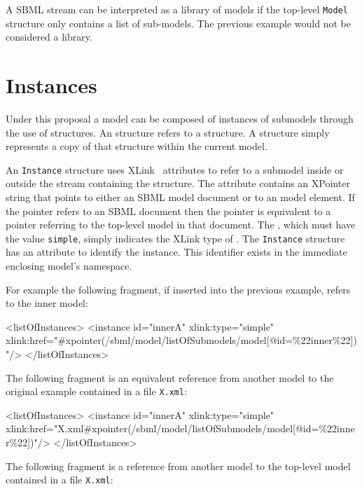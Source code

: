\documentclass{cekarticle}
\begin{document}
A SBML stream can be interpreted as a library of models if the top-level \texttt{Model} structure only contains a list of sub-models.  The previous
example would not be considered a library.

\section{Instances}
\label{sec:instances}

Under this proposal a model can be composed of instances of submodels through the use
of  structures.  An  structure refers to a
 structure.  A  structure simply represents a copy of
that  structure within the current model.

An \texttt{Instance} structure uses XLink~\citep{derose:2001} attributes to refer to
a submodel inside or outside the stream containing the  structure.
The  attribute contains an XPointer~\citep{derose:2002} string that
points to either an SBML model document or to an model element.  If the pointer
refers to an SBML document then the pointer is equivalent to a pointer referring to
the top-level model in that document. The , which must have the value
\texttt{simple}, simply indicates the XLink type of . The
\texttt{Instance} structure has an  attribute to identify the instance.
This identifier exists in the immediate enclosing model's namespace. 

For example the following fragment, if inserted into the previous example, refers to the inner model:
\begin{example}
<listOfInstances>
    <instance
        id="innerA"
        xlink:type="simple"
        xlink:href="#xpointer(/sbml/model/listOfSubmodels/model[@id=\%22inner\%22])"/>
</listOfInstances>
\end{example}

The following fragment is an equivalent reference from another model to the original example contained in a file \texttt{X.xml}:

\begin{example}
<listOfInstances>
    <instance
        id="innerA" 
        xlink:type="simple"
        xlink:href="X.xml#xpointer(/sbml/model/listOfSubmodels/model[@id=\%22inner\%22])"/>
</listOfInstances>
\end{example}

The following fragment is a reference from another model to the top-level model contained in a file \texttt{X.xml}:
\end{document}
